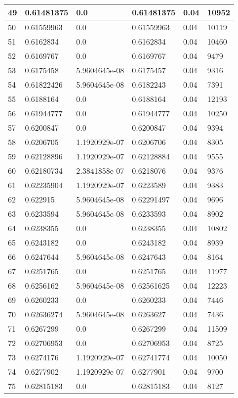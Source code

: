 \begin{longtable}{|l|l|l|l|l|l|}
49 & 0.61481375 & 0.0 & 0.61481375 & 0.04 & 10952 \\ \hline 
50 & 0.61559963 & 0.0 & 0.61559963 & 0.04 & 10119 \\ \hline 
51 & 0.6162834 & 0.0 & 0.6162834 & 0.04 & 10460 \\ \hline 
52 & 0.6169767 & 0.0 & 0.6169767 & 0.04 & 9479 \\ \hline 
53 & 0.6175458 & 5.9604645e-08 & 0.6175457 & 0.04 & 9316 \\ \hline 
54 & 0.61822426 & 5.9604645e-08 & 0.6182243 & 0.04 & 7391 \\ \hline 
55 & 0.6188164 & 0.0 & 0.6188164 & 0.04 & 12193 \\ \hline 
56 & 0.61944777 & 0.0 & 0.61944777 & 0.04 & 10250 \\ \hline 
57 & 0.6200847 & 0.0 & 0.6200847 & 0.04 & 9394 \\ \hline 
58 & 0.6206705 & 1.1920929e-07 & 0.6206706 & 0.04 & 8305 \\ \hline 
59 & 0.62128896 & 1.1920929e-07 & 0.62128884 & 0.04 & 9555 \\ \hline 
60 & 0.62180734 & 2.3841858e-07 & 0.6218076 & 0.04 & 9376 \\ \hline 
61 & 0.62235904 & 1.1920929e-07 & 0.6223589 & 0.04 & 9383 \\ \hline 
62 & 0.622915 & 5.9604645e-08 & 0.62291497 & 0.04 & 9696 \\ \hline 
63 & 0.6233594 & 5.9604645e-08 & 0.6233593 & 0.04 & 8902 \\ \hline 
64 & 0.6238355 & 0.0 & 0.6238355 & 0.04 & 10802 \\ \hline 
65 & 0.6243182 & 0.0 & 0.6243182 & 0.04 & 8939 \\ \hline 
66 & 0.6247644 & 5.9604645e-08 & 0.6247643 & 0.04 & 8164 \\ \hline 
67 & 0.6251765 & 0.0 & 0.6251765 & 0.04 & 11977 \\ \hline 
68 & 0.6256162 & 5.9604645e-08 & 0.62561625 & 0.04 & 12223 \\ \hline 
69 & 0.6260233 & 0.0 & 0.6260233 & 0.04 & 7446 \\ \hline 
70 & 0.62636274 & 5.9604645e-08 & 0.6263627 & 0.04 & 7436 \\ \hline 
71 & 0.6267299 & 0.0 & 0.6267299 & 0.04 & 11509 \\ \hline 
72 & 0.62706953 & 0.0 & 0.62706953 & 0.04 & 8725 \\ \hline 
73 & 0.6274176 & 1.1920929e-07 & 0.62741774 & 0.04 & 10050 \\ \hline 
74 & 0.6277902 & 1.1920929e-07 & 0.6277901 & 0.04 & 9700 \\ \hline 
75 & 0.62815183 & 0.0 & 0.62815183 & 0.04 & 8127 \\ \hline 
\end{longtable}